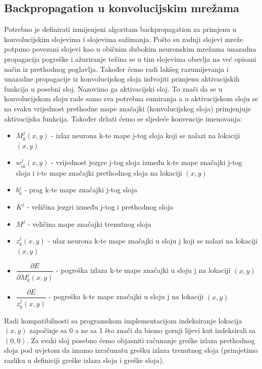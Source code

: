 \documentclass[times, utf8, zavrsni]{fer}
\begin{document}
\subsection{Backpropagation u konvolucijskim mrežama}
Potrebno je definirati izmijenjeni algoritam backpropagation za primjenu u konvolucijskim slojevima i slojevima sažimanja. Pošto su zadnji slojevi mreže potpuno povezani slojevi kao u običnim dubokim neuronskim mrežama unazadna propagacija pogreške i ažuriranje težina se u tim slojevima obavlja na već opisani način iz prethodnog poglavlja. Također ćemo radi lakšeg razumijevanja i unazadne propagacije iz konvolucijskog sloja izdvojiti primjenu aktivacijskih funkcija u posebni sloj. Nazovimo ga aktivacijski sloj. To znači da se u konvolucijskom sloju rade samo sva potrebna sumiranja a u aktivacijskom sloju se na svaku vrijednost prethodne mape značajki (konvolucijskog sloja) primjenjuje aktivacijska funkcija. Također držati ćemo se sljedeće konvencije imenovanja:
\begin{itemize}
  \item $M_k^j (x, y)$ - izlaz neurona k-te mape j-tog sloja koji se nalazi na lokaciji $(x, y)$
  \item $w^j_{ik} (x, y)$ - vrijednost jezgre j-tog sloja između k-te mape značajki j-tog sloja i i-te mape značajki prethodnog sloja na lokaciji $(x, y)$
  \item $b^j_k$ - prag k-te mape značajki j-tog sloja
  \item $K^j$ - veličina jezgri između j-tog i prethodnog sloja
  \item $M^j$ - veličina mape značajki trenutnog sloja
  \item $z^j_k (x, y)$ - ulaz neurona k-te mape značajki u sloju j koji se nalazi na lokaciji $(x, y)$
  \item $\dfrac{\partial E}{\partial M^j_k (x, y)}$ - pogreška izlaza k-te mape značajki u sloju j na lokaciji $(x, y)$
  \item $\dfrac{\partial E}{z^j_k (x, y)}$ - pogreška k-te mape značajki u sloju j na lokaciji $(x, y)$
\end{itemize}

Radi kompatibilnosti sa programskom implementacijom indeksiranje lokacija $(x, y)$ započinje sa 0 a ne sa 1 što znači da bismo gornji lijevi kut indeksirali sa $(0, 0)$.
Za svaki sloj posebno ćemo objasniti računanje greške izlaza prethodnog sloja pod uvjetom da imamo izračunatu grešku izlaza trenutnog sloja (primjetimo razliku u definiciji greške izlaza sloja i greške sloja).
\end{document}

